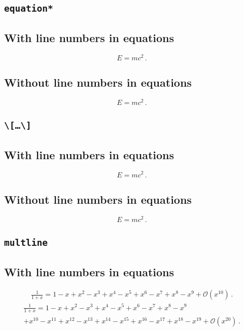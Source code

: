 \documentclass{ltxdoc}
\begin{document}
\subsection*{\texttt{equation*}}

\subsection*{With line numbers in equations}
\nextlipsum
\begin{equation*}
  E = m c^2 \,.
\end{equation*}
\nextlipsum

\subsection*{Without line numbers in equations}
\nextlipsum
\begin{linenomath*}
\begin{equation*}
  E = m c^2 \,.
\end{equation*}
\end{linenomath*}
\nextlipsum

\subsection*{\texttt{\textbackslash[\ldots\textbackslash]}}

\subsection*{With line numbers in equations}
\nextlipsum
\[
  E = m c^2 \,.
\]
\nextlipsum

\subsection*{Without line numbers in equations}
\nextlipsum
\begin{linenomath*}
\[
  E = m c^2 \,.
\]
\end{linenomath*}
\nextlipsum

\subsection*{\texttt{multline}}

\subsection*{With line numbers in equations}
\nextlipsum
\begin{multline}
  \frac{1}{1 + x} = 1 - x + x^{2} - x^{3} + x^{4} - x^{5} + x^{6} - x^{7} + x^{8} - x^{9} + \mathcal{O}(x^{10}) \,.
\end{multline}
\nextlipsum
\begin{multline}
  \frac{1}{1 + x} = 1 - x + x^{2} - x^{3} + x^{4} - x^{5} + x^{6} - x^{7} + x^{8} - x^{9} \\
  + x^{10} - x^{11} + x^{12} - x^{13} + x^{14} - x^{15} + x^{16} - x^{17} + x^{18} - x^{19} + \mathcal{O}(x^{20}) \,.
\end{multline}
\nextlipsum
\end{document}
